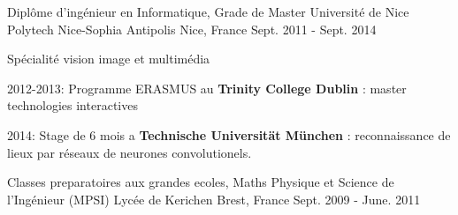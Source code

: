 \begin{cventries}
  \cventry
    {Diplôme d'ingénieur en Informatique, Grade de Master} %
    {Université de Nice Polytech Nice-Sophia Antipolis} %
    {Nice, France} %
    {Sept. 2011 - Sept. 2014} %
    {
      \begin{cvitems} %
        \item Spécialité vision image et multimédia
        \item 2012-2013: Programme ERASMUS au \textbf{Trinity College Dublin} : master technologies interactives
        \item 2014: Stage de 6 mois a \textbf{Technische Universität München} : reconnaissance de lieux par réseaux de neurones convolutionels.
      \end{cvitems}
    }


  \cventry
    {Classes preparatoires aux grandes ecoles, Maths Physique et Science de l'Ingénieur (MPSI)} %
    {Lycée de Kerichen} %
    {Brest, France} %
    {Sept. 2009 - June. 2011} %
    {}
\end{cventries}
